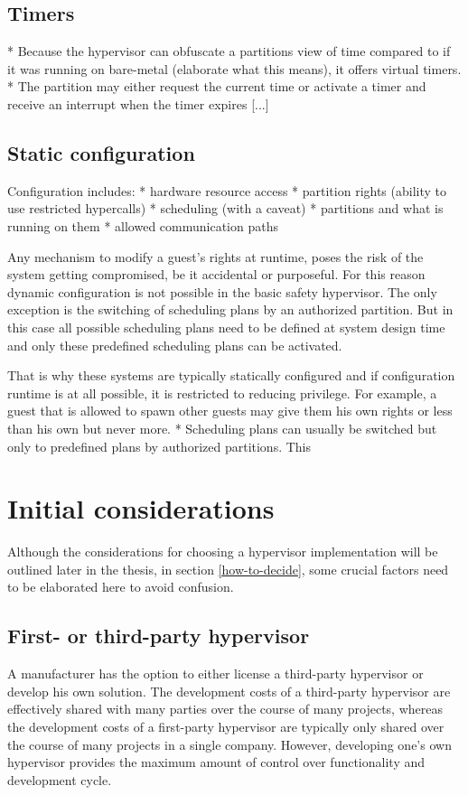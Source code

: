 \subsection{Timers}
* Because the hypervisor can obfuscate a partitions view of time compared to if it was running on bare-metal (elaborate what this means), it offers virtual timers.
* The partition may either request the current time or activate a timer and receive an interrupt when the timer expires [...]
\subsection{Static configuration}
Configuration includes: 
* hardware resource access
* partition rights (ability to use restricted hypercalls)
* scheduling (with a caveat)
* partitions and what is running on them
* allowed communication paths

Any mechanism to modify a guest's rights at runtime, poses the risk of the system getting compromised, be it accidental or purposeful. For this reason dynamic configuration is not possible in the basic safety hypervisor. The only exception is the switching of scheduling plans by an authorized partition. But in this case all possible scheduling plans need to be defined at system design time and only these predefined scheduling plans can be activated.

That is why these systems are typically statically configured and if configuration runtime is at all possible, it is restricted to reducing privilege. For example, a guest that is allowed to spawn other guests may give them his own rights or less than his own but never more.
* Scheduling plans can usually be switched but only to predefined plans by authorized partitions. This

\section{Initial considerations}
Although the considerations for choosing a hypervisor implementation will be outlined later in the thesis, in section \ref{how-to-decide}, some crucial factors need to be elaborated here to avoid confusion.
\subsection{First- or third-party hypervisor}
A manufacturer has the option to either license a third-party hypervisor or develop his own solution. The development costs of a third-party hypervisor are effectively shared with many parties over the course of many projects, whereas the development costs of a first-party hypervisor are typically only shared over the course of many projects in a single company. However, developing one's own hypervisor provides the maximum amount of control over functionality and development cycle.

